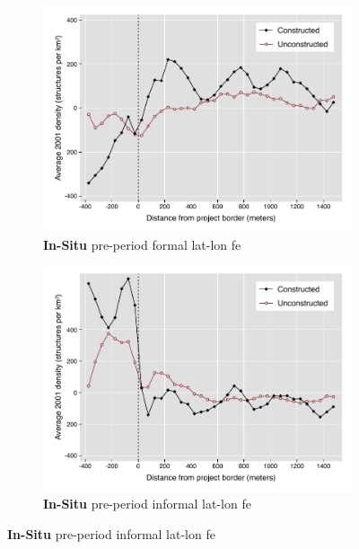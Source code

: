 \documentclass[12pt]{article}
\begin{document}
\begin{figure}
\begin{subfigure}[b]{0.48\textwidth}
        \end{subfigure}
        \begin{subfigure}[b]{0.48\textwidth}
                    \caption[Network2]%
            {{\footnotesize \textbf{In-Situ} pre-period formal lat-lon fe }}   
            \label{fig:prefor}
            \centering
            \includegraphics[width=\textwidth,trim={0.3cm .3cm 0.1cm 0cm}, clip=true]{figures/bblu_for_fe_pre_means_4_2_30k.pdf}

        \end{subfigure}
        \hfill
        \begin{subfigure}[b]{0.48\textwidth}  
                    \caption[]%
            {{\footnotesize \textbf{In-Situ} pre-period informal lat-lon fe }}     
            \label{fig:preinf}
            \centering 
            \includegraphics[width=\textwidth,trim={0.3cm .3cm 0.1cm 0cm}, clip=true]{figures/bblu_inf_fe_pre_means_4_2_30k.pdf}


\end{subfigure}
\end{figure}
\end{document}
